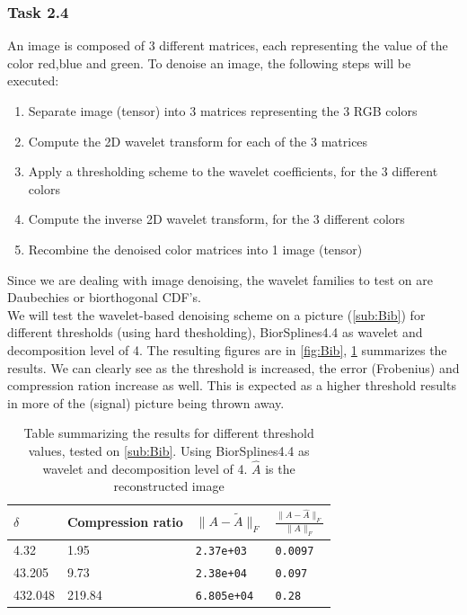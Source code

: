 \documentclass[a4paper]{article}
\begin{document}
    \subsubsection{Task 2.4}
	An image is composed of 3 different matrices, each representing the value of the color red,blue and green. To denoise an image, the following steps will be executed:
	\begin{enumerate}
		\item Separate image (tensor) into 3 matrices representing the 3 RGB colors
		\item Compute the 2D wavelet transform for each of the 3 matrices
		\item Apply a thresholding scheme to the wavelet coefficients, for the 3 different colors
		\item Compute the inverse 2D wavelet transform, for the 3 different colors
		\item Recombine the denoised color matrices into 1 image (tensor)
	\end{enumerate}
	Since we are dealing with image denoising, the wavelet families to test on are Daubechies or biorthogonal CDF's. \\

	We will test the wavelet-based denoising scheme on a picture (\cref{sub:Bib}) for different thresholds (using hard thesholding), BiorSplines4.4 as wavelet and decomposition level of 4. The resulting figures are in \cref{fig:Bib}, \cref{tab:bib} summarizes the results. We can clearly see as the threshold is increased, the error (Frobenius) and compression ration increase as well. This is expected as a higher threshold results in more of the (signal) picture being thrown away.

\begin{table}[H]
	\centering
	\begin{tabular}{|l|l|l|l|}
	\hline
	$\delta$	& Compression ratio & $\|A-\tilde{A}\|_F$ & $\frac{\|A-\hat{A}\|_F}{\|A\|_F}$ \\ \hline
	4.32	& 1.95 & \texttt{2.37e+03} & \texttt{0.0097} \\ \hline
	43.205	& 9.73 & \texttt{2.38e+04} & \texttt{0.097} \\ \hline
	432.048	& 219.84 & \texttt{6.805e+04} & \texttt{0.28} \\ \hline
	\end{tabular}
	\caption{Table summarizing the results for different threshold values, tested on \cref{sub:Bib}. Using BiorSplines4.4 as wavelet and decomposition level of 4. $\hat{A}$ is the reconstructed image}
	\label{tab:bib}
\end{table}
\end{document}
